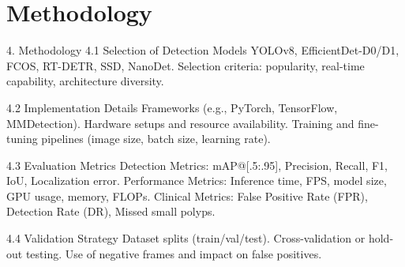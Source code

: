\section{Methodology}
\label{sec:method}

4. Methodology
    4.1 Selection of Detection Models
        YOLOv8, EfficientDet-D0/D1, FCOS, RT-DETR, SSD, NanoDet.
        Selection criteria: popularity, real-time capability, architecture diversity.
        
    4.2 Implementation Details
        Frameworks (e.g., PyTorch, TensorFlow, MMDetection).
        Hardware setups and resource availability.
        Training and fine-tuning pipelines (image size, batch size, learning rate).

    4.3 Evaluation Metrics
        Detection Metrics: mAP@[.5:.95], Precision, Recall, F1, IoU, Localization error.
        Performance Metrics: Inference time, FPS, model size, GPU usage, memory, FLOPs.
        Clinical Metrics: False Positive Rate (FPR), Detection Rate (DR), Missed small polyps.

    4.4 Validation Strategy
        Dataset splits (train/val/test).
        Cross-validation or hold-out testing.
        Use of negative frames and impact on false positives.